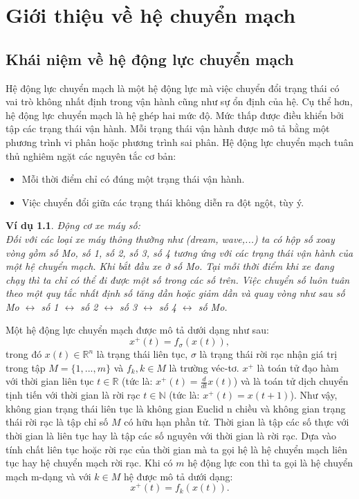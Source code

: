 \documentclass[14pt,a4paper,oneside]{report}		%
\newtheorem{example}[theorem]{Ví dụ}
\begin{document}
\chapter{Giới thiệu về hệ chuyển mạch}
\section{Khái niệm về hệ động lực chuyển mạch}
Hệ động lực chuyển mạch là một hệ động lực mà việc chuyển đổi trạng thái có vai trò không nhất định trong vận hành cũng như sự ổn định của hệ. Cụ thể hơn, hệ động lực chuyển mạch là hệ ghép hai mức độ. Mức thấp được điều khiển bởi tập các trạng thái vận hành. Mỗi trạng thái vận hành được mô tả bằng một phương trình vi phân hoặc phương trình sai phân. Hệ động lực chuyển mạch tuân thủ nghiêm ngặt các nguyên tắc cơ bản:
\begin{itemize}
  \item Mỗi thời điểm chỉ có đúng một trạng thái vận hành.
  \item Việc chuyển đổi giữa các trạng thái không diễn ra đột ngột, tùy ý.
\end{itemize}
\begin{example}
Động cơ xe máy số:\\

Đối với các loại xe máy thông thường như (dream, wave,...) ta có hộp số xoay vòng gồm số Mo, số 1, số 2, số 3, số 4 tương ứng với các trạng thái vận hành của một hệ chuyển mạch. Khi bắt đầu xe ở số Mo. Tại mỗi thời điểm khi xe đang chạy thì ta chỉ có thể đi được một số trong các số trên. Việc chuyển số luôn tuân theo một quy tắc nhất định số tăng dần hoặc giảm dần và quay vòng như sau số Mo $\leftrightarrow$ số 1 $\leftrightarrow$ số 2 $\leftrightarrow$ số 3 $\leftrightarrow$ số 4 $\leftrightarrow$ số Mo.  
\\
\end{example}

Một hệ động lực chuyển mạch được mô tả dưới dạng như sau:
\begin{equation} \label{eq1-1}
x^+(t) = f_\sigma(x(t)),
\end{equation}
trong đó $x(t)\in\mathbb{R}^n$ là trạng thái liên tục, $\sigma$ là trạng thái rời rạc nhận giá trị trong tập $M = \{1,...,m\}$ và $f_k, k\in M$ là trường véc-tơ. $x^+$ là toán tử đạo hàm với thời gian liên tục $t\in\mathbb{R}$ (tức là: $x^+(t)=\frac{d}{dt}x(t)$) và là toán tử dịch chuyển tịnh tiến với thời gian là rời rạc $t\in\mathbb{N}$ (tức là: $x^+(t)=x(t+1)$). Như vậy, không gian trạng thái liên tục là không gian Euclid n chiều và không gian trạng thái rời rạc là tập chỉ số $M$ có hữu hạn phần tử. Thời gian là tập các số thực với thời gian là liên tục hay là tập các số nguyên với thời gian là rời rạc. Dựa vào tính chất liên tục hoặc rời rạc của thời gian mà ta gọi hệ là hệ chuyển mạch liên tục hay hệ chuyển mạch rời rạc. Khi có $m$ hệ động lực con thì ta gọi là hệ chuyển mạch m-dạng và với $k\in M$ hệ được mô tả dưới dạng:
\begin{equation} \label{eq1-2}
x^+(t) = f_k(x(t)).
\end{equation}
\end{document}
